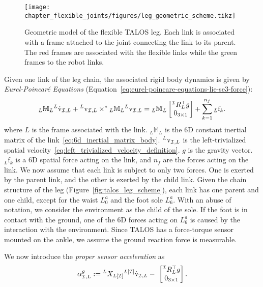 \begin{figure}[t]
    \centering
	\texttt{[image: chapter\_flexible\_joints/figures/leg\_geometric\_scheme.tikz]}
	\caption[Geometric model of the flexible TALOS leg.]{Geometric model of the flexible TALOS leg. Each link is associated with a frame attached to the joint connecting the link to its parent. The red frames are associated with the flexible links while the green frames to the robot links.}
	\label{fig:leg_geometric_scheme}
\end{figure}
\par
Given one link of the leg chain, the associated rigid body dynamics is given by \emph{Eurel-Poincaré Equations} (Equation~\eqref{eq:eurel-poincare-equations-lie-se3-force}): 
\begin{equation}
\label{eq:eurel-poincare-equations-lie-se3-force-flex-joints}
     {}_L \mathbb{M} _ L {}^L \dot{\mathrm{v}} _{\mathcal{I}, L} + {}^L \mathrm{v} _{\mathcal{I}, L } \times^* {}_L \mathbb{M} _ L {}^L \mathrm{v} _{\mathcal{I}, L }  = {}_L \mathbb{M} _ L \begin{bmatrix}
      {}^{\mathcal{I}} R _ L ^\top g \\ 
      0_{3\times1}
     \end{bmatrix} + \sum_{k=1}^{n_f} {}_L  \mathrm{f}_k.
\end{equation}
where $L$ is the frame associated with the link. ${}_L \mathbb{M} _ L$ is the 6D constant inertial matrix of the link~\eqref{eq:6d_inertial_matrix_body}. ${}^L \mathrm{v} _{\mathcal{I}, L }$ is the left-trivialized spatial velocity~\eqref{eq:left_trivialized_velocity_definition}. $g$ is the gravity vector. ${}_L\mathrm{f}_k$ is a 6D spatial force acting on the link, and $n_f$ are the forces acting on the link.
We now assume that each link is subject to only two forces. One is exerted by the parent link, and the other is exerted by the child link. Given the chain structure of the leg (Figure~\ref{fig:talos_leg_scheme}), each link has one parent and one child, except for the waist $L^a_0$ and the foot sole $L^a_6$. With an abuse of notation, we consider the environment as the child of the sole. If the foot is in contact with the ground, one of the 6D forces acting on $L_6^a$ is caused by the interaction with the environment. Since TALOS has a force-torque sensor mounted on the ankle, we assume the ground reaction force is measurable. 
\par
We now introduce the \emph{proper sensor acceleration} as~\citep[Section~2.4.4]{Traversaro2017ModellingDynamics}
\begin{equation}
\label{eq:proper_sensor_acceleration_def}
    \alpha _ {\mathcal{I},L}^g := {}^L X_ {L[\mathcal{I}]} {}^{L[\mathcal{I}]} \dot{\mathrm{v}}_ {\mathcal{I},L} - \
    \begin{bmatrix}
     {}^{\mathcal{I}} R _ L ^\top g \\ 
      0_{3\times1}
    \end{bmatrix}.
\end{equation}
